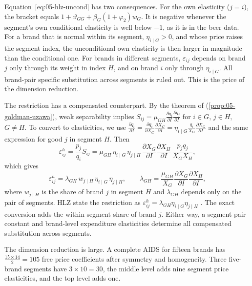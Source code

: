 Equation~\eqref{eq:05-hlz-uncond} has two consequences. For the own elasticity ($j = i$), the bracket equals
$1 + \vartheta_{GG} + \beta_G(1 + \varphi_2)w_G$. It is negative whenever the segment's own conditional
elasticity is well below $-1$, as it is in the beer data. For a brand that is normal within its segment,
$\eta_{i\mid G} > 0$, and whose price raises the segment index, the unconditional own elasticity is then larger
in magnitude than the conditional one. For brands in different segments, $\varepsilon_{ij}$ depends on brand $j$
only through its weight in index $H$, and on brand $i$ only through $\eta_{i\mid G}$. All brand-pair specific
substitution across segments is ruled out. This is the price of the dimension reduction.

The restriction has a compensated counterpart. By the theorem of \citet{GoldmanUzawa1964}
(\cref{prop:05-goldman-uzawa}), weak separability implies $S_{ij} = \mu_{GH}\frac{\partial q_i}{\partial I}\frac{\partial q_j}{\partial I}$
for $i\in G$, $j\in H$, $G\neq H$. To convert to elasticities, we use
$\frac{\partial q_i}{\partial I} = \frac{\partial q_i}{\partial X_G}\frac{\partial X_G}{\partial I}
= \eta_{i\mid G}\frac{q_i}{X_G}\frac{\partial X_G}{\partial I}$ and the same expression for good $j$ in segment $H$.
Then
\begin{equation*}
  \varepsilon^h_{ij} = \frac{p_j}{q_i}S_{ij}
  = \mu_{GH}\,\eta_{i\mid G}\,\eta_{j\mid H}\,\frac{\partial X_G}{\partial I}\frac{\partial X_H}{\partial I}\,
    \frac{p_jq_j}{X_GX_H},
\end{equation*}
which gives
\begin{equation*}
  \varepsilon^h_{ij} = \lambda_{GH}\,w_{j\mid H}\,\eta_{i\mid G}\,\eta_{j\mid H},
  \qquad \lambda_{GH} = \frac{\mu_{GH}}{X_G}\frac{\partial X_G}{\partial I}\frac{\partial X_H}{\partial I},
\end{equation*}
where $w_{j\mid H}$ is the share of brand $j$ in segment $H$ and $\lambda_{GH}$ depends only on the pair of
segments. HLZ state the restriction as $\varepsilon^h_{ij} = \lambda_{GH}\eta_{i\mid G}\eta_{j\mid H}$
\citep[eq.~5]{HausmanLeonardZona1994}. The exact conversion adds the within-segment share of brand $j$. Either
way, a segment-pair constant and brand-level expenditure elasticities determine all compensated substitution
across segments.

The dimension reduction is large. A complete AIDS for fifteen brands has $\frac{15 \times 14}{2} = 105$ free
price coefficients after symmetry and homogeneity. Three five-brand segments have $3 \times 10 = 30$, the middle
level adds nine segment price elasticities, and the top level adds one.

